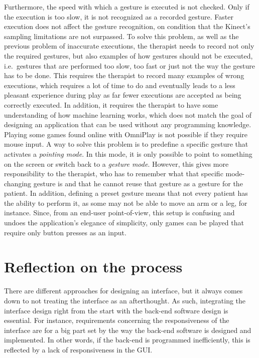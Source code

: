Furthermore, the speed with which a gesture is executed is not checked. Only if the execution is too slow, it is not recognized as a recorded gesture. Faster execution does not affect the gesture recognition, on condition that the Kinect's sampling limitations are not surpassed. To solve this problem, as well as the previous problem of inaccurate executions, the therapist needs to record not only the required gestures, but also examples of how gestures should not be executed, i.e.\ gestures that are performed too slow, too fast or just not the way the gesture has to be done. This requires the therapist to record many examples of wrong executions, which requires a lot of time to do and eventually leads to a less pleasant experience during play as far fewer executions are accepted as being correctly executed. In addition, it requires the therapist to have some understanding of how machine learning works, which does not match the goal of designing an application that can be used without any programming knowledge.\\

Playing some games found online with OmniPlay is not possible if they require mouse input.
A way to solve this problem is to predefine a specific gesture that activates a \emph{pointing mode}. In this mode, it is only possible to point to something on the screen or switch back to a \emph{gesture mode}. However, this gives more responsibility to the therapist, who has to remember what that specific mode-changing gesture is and that he cannot reuse that gesture as a gesture for the patient. In addition, defining a preset gesture means that not every patient has the ability to perform it, as some may not be able to move an arm or a leg, for instance. Since, from an end-user point-of-view, this setup is confusing and undoes the application's elegance of simplicity, only games can be played that require only button presses as an input.





\section{Reflection on the process}

There are different approaches for designing an interface, but it always comes down to not treating the interface as an afterthought. As such, integrating the interface design right from the start with the back-end software design is essential. For instance, requirements concerning the responsiveness of the interface are for a big part set by the way the back-end software is designed and implemented. In other words, if the back-end is programmed inefficiently, this is reflected by a lack of responsiveness in the GUI.\\

